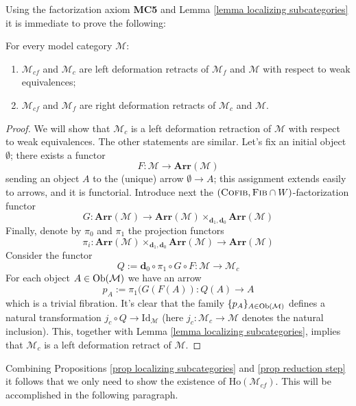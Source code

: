Using the factorization axiom {\bfseries MC5} and Lemma \ref{lemma localizing subcategories} it is immediate to prove the following:

\begin{prop} \label{prop reduction step}
For every model category $\mathcal M$:
\begin{enumerate}
\item $\mathcal M_{cf}$ and $\mathcal M_c$ are left deformation retracts of $\mathcal M_f$ and $\mathcal M$ with respect to weak equivalences;
\item $\mathcal M_{cf}$ and $\mathcal M_f$ are right deformation retracts of $\mathcal M_c$ and $\mathcal M$.
\end{enumerate}
\end{prop}

\begin{proof}
We will show that $\mathcal M_c$ is a left deformation retraction of $\mathcal M$ with respect to weak equivalences. The other statements are similar. Let's fix an initial object $\emptyset$; there exists a functor
\[
F \colon \mathcal M \to \mathbf{Arr}(\mathcal M)
\]
sending an object $A$ to the (unique) arrow $\emptyset \to A$; this assignment extends easily to arrows, and it is functorial. Introduce next the $(\textsc{Cofib},\textsc{Fib} \cap W)$-factorization functor
\[
G \colon \mathbf{Arr}(\mathcal M) \to \mathbf{Arr}(\mathcal M) \times_{\mathbf d_1, \mathbf d_0} \mathbf{Arr}(\mathcal M)
\]
Finally, denote by $\pi_0$ and $\pi_1$ the projection functors
\[
\pi_i \colon \mathbf{Arr}(\mathcal M) \times_{\mathbf d_1, \mathbf d_0} \mathbf{Arr}(\mathcal M) \to \mathbf{Arr}(\mathcal M)
\]
Consider the functor
\[
Q := \mathbf d_0 \circ \pi_1 \circ G \circ F \colon \mathcal M \to \mathcal M_c
\]
For each object $A \in \mathrm{Ob}(\mathcal M)$ we have an arrow
\[
p_A := \pi_1(G(F(A)) \colon Q(A) \to A
\]
which is a trivial fibration. It's clear that the family $\{p_A\}_{A \in \mathrm{Ob}(\mathcal M)}$ defines a natural transformation $j_c \circ Q \to \mathrm{Id}_{\mathcal M}$ (here $j_c \colon \mathcal M_c \to \mathcal M$ denotes the natural inclusion). This, together with Lemma \ref{lemma localizing subcategories}, implies that $\mathcal M_c$ is a left deformation retract of $\mathcal M$.
\end{proof}

Combining Propositions \ref{prop localizing subcategories} and \ref{prop reduction step} it follows that we only need to show the existence of $\mathrm{Ho}(\mathcal M_{cf})$. This will be accomplished in the following paragraph.

